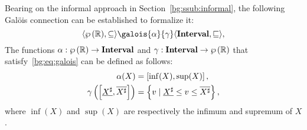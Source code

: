 Bearing on the informal approach in Section~\ref{bg:ssub:informal}, the
following Gal\"ois connection can be established to formalize it:
\begin{equation}
    \lattice{\powersetof\realset}{\subseteq}
    \galois{\alpha}{\gamma}
    \lattice{\intervalset}{\sqsubseteq},
\end{equation}
The functions $\alpha: \wp\left({\mathbb{R}}\right) \to \mathbf{Interval}$ and $\gamma:
\mathbf{Interval} \to \wp\left({\mathbb{R}}\right)$ that satisfy~\eqref{bg:eq:galois} can be
defined as follows:
\begin{equation}
    \begin{aligned}
        \alpha(X) &= \left[{\inf(X)}, {\sup(X)}\right], \\
        \gamma\left(
            \left[{\underline{X^\sharp}}, {\overline{X^\sharp}}\right]
        \right) &= \left\{
            v \mid \underline{X^\sharp} \leq v \leq \overline{X^\sharp}
        \right\},
    \end{aligned}
\end{equation}
where $\inf(X)$ and $\sup(X)$ are respectively the infimum and supremum of $X$.

